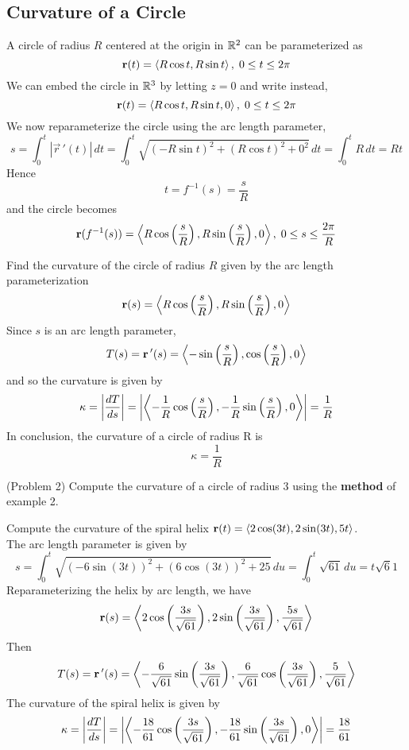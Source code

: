\documentclass[handout]{ximera}
\begin{document}
\subsection{Curvature of a Circle}
A circle of radius $R$ centered at the origin in $\mathbb R^2$ can be parameterized as
\[
\mathbf r(t) = \left\langle R\cos t, R\sin t\right\rangle, \; 0\leq t \leq 2\pi
\]
We can embed the circle in $\mathbb R^3$ by letting $z = 0$ and write instead,
\[
\mathbf r(t) = \left\langle R\cos t, R\sin t, 0\right\rangle, \; 0\leq t \leq 2\pi
\]
We now reparameterize the circle using the arc length parameter,
\[
s = \int_0^t |\vec r\,'(t)| \, dt = \int_0^t \sqrt{ (-R\sin t)^2 + (R\cos t)^2 + 0^2} \, dt = \int_0^t R \, dt = Rt
\]
Hence 
\[
t = f^{-1}(s) = \frac{s}{R}
\]
and the circle becomes
\[
\mathbf r(f^{-1}(s)) = \left\langle R \cos\left(\frac{s}{R}\right), R \sin\left(\frac{s}{R}\right), 0\right\rangle, \; 0 \leq s \leq \frac{2\pi}{R}
\]
\begin{example}[Example 2]
Find the curvature of the circle of radius $R$ given by the arc length parameterization
\[
\mathbf r(s) = \left\langle R \cos\left(\frac{s}{R}\right), R \sin\left(\frac{s}{R}\right), 0\right\rangle
\]
Since $s$ is an arc length parameter, 
\[
T(s) = \mathbf r\,'(s) = \left\langle -\sin\left(\frac{s}{R}\right), \cos\left(\frac{s}{R}\right), 0\right\rangle
\]
and so the curvature is given by
\[
\kappa = \left|\frac{dT}{ds}\right| = \left|\left\langle -\frac{1}{R}\cos\left(\frac{s}{R}\right), -\frac{1}{R}\sin\left(\frac{s}{R}\right), 0\right\rangle\right| = \frac{1}{R}
\]
In conclusion, the curvature of a circle of radius R is 
\[
\kappa = \frac{1}{R}
\]
\end{example}

\begin{problem}(Problem 2)
Compute the curvature of a circle of radius 3 using the \textbf{method} of example 2.
\end{problem}

\begin{example}[Example 3]
Compute the curvature of the spiral helix $\mathbf r(t) = \left\langle 2\cos(3t), 2 \sin(3t), 5t\right\rangle$.\\
The arc length parameter is given by
\[
s = \int_0^t \sqrt{\left(-6\sin(3t) \right)^2+\left(6\cos(3t) \right)^2 + 25} \, du = \int_0^t \sqrt{61} \, du = t\sqrt 61
\]
Reparameterizing the helix by arc length, we have
\[
\mathbf r(s) = \left\langle 2\cos\left(\frac{3s}{\sqrt{61}}\right), 2 \sin\left(\frac{3s}{\sqrt{61}}\right), \frac{5s}{\sqrt{61}}\right\rangle
\]
Then
\[
T(s) = \mathbf r\,'(s) = \left\langle -\frac{6}{\sqrt{61}}\sin\left(\frac{3s}{\sqrt{61}}\right), \frac{6}{\sqrt{61}}\cos\left(\frac{3s}{\sqrt{61}}\right), \frac{5}{\sqrt{61}}\right\rangle
\]
The curvature of the spiral helix is given by
\[
\kappa = \left| \frac{dT}{ds} \right| = \left|\left\langle -\frac{18}{61}\cos\left(\frac{3s}{\sqrt{61}}\right), -\frac{18}{61}\sin\left(\frac{3s}{\sqrt{61}}\right), 0\right\rangle\right| = \frac{18}{61}
\]
\end{example}
\end{document}
